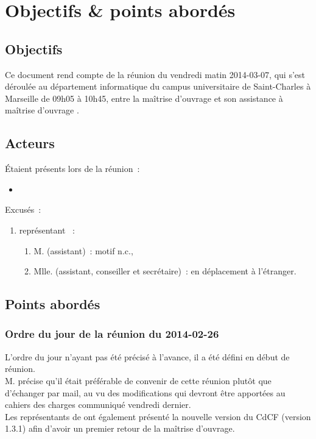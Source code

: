\documentclass[11pt,fleqn]{report}
\begin{document}
\ZMakeCover


\chapter{Objectifs \& points abordés}

\section{Objectifs}
Ce document rend compte de la réunion du vendredi matin 2014-03-07, qui s'est déroulée au département informatique du campus universitaire de Saint-Charles à Marseille de 09h05 à 10h45, entre la maîtrise d'ouvrage \mo et son assistance à maîtrise d'ouvrage \amo.

\section{Acteurs}
Étaient présents lors de la réunion~:
\begin{itemize}
	\item \Agopi
\end{itemize}
Excusés~:
\begin{enumerate}
	\item représentant \amo~:
	\begin{enumerate}
		\item M. \Balde (assistant)~: motif n.c.,
		\item Mlle. \Toure (assistant, conseiller et secrétaire)~: en déplacement à l'étranger.
	\end{enumerate}
\end{enumerate}

\section{Points abordés}

\subsection{Ordre du jour de la réunion du 2014-02-26}
L'ordre du jour n'ayant pas été précisé à l'avance, il a été défini en début de réunion.
\\
M. \Agopian précise qu'il était préférable de convenir de cette réunion plutôt que d'échanger par mail, au vu des modifications qui devront être apportées au cahiers des charges communiqué vendredi dernier.
\\
Les représentants de \amo ont également présenté la nouvelle version du CdCF (version 1.3.1) afin d'avoir un premier retour de la maîtrise d'ouvrage.
\end{document}
